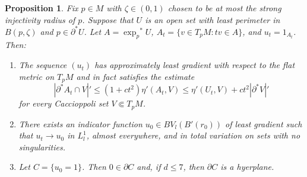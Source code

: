 \documentclass[reqno,12pt,letterpaper]{amsart}
\newtheorem{proposition}[theorem]{Proposition}
\theoremstyle{definition}
\numberwithin{equation}{section}
\begin{document}
\begin{proposition}\label{blowup theorem}
Fix $p \in M$ with $\zeta \in (0, 1)$ chosen to be at most the strong injectivity radius of $p$.
Suppose that $U$ is an open set with least perimeter in $B(p, \zeta)$ and $p \in \partial^* U$.
Let $A = {\exp_p}^* U$, $A_t = \{v \in T_pM: tv \in A\}$, and $u_t = 1_{A_t}$.
Then:
\begin{enumerate}
\item The sequence $(u_t)$ has approximately least gradient with respect to the flat metric on $T_pM$ and in fact satisfies the estimate
\begin{equation}\label{approximately least gradient target}|
\partial^* A_t \cap V|' \leq (1 + ct^2)\eta'(A_t, V) \leq \eta'(U_t, V) + ct^2|\partial^* V|'
\end{equation}
for every Caccioppoli set $V \Subset T_pM$.
\item There exists an indicator function $u_0 \in BV_l(B'(r_0))$ of least gradient such that $u_t \to u_0$ in $L^1_l$, almost everywhere, and in total variation on sets with no singularities.
\item Let $C = \{u_0 = 1\}$. Then $0 \in \partial C$ and, if $d \leq 7$, then $\partial C$ is a hyerplane.
\end{enumerate}
\end{proposition}
\end{document}
